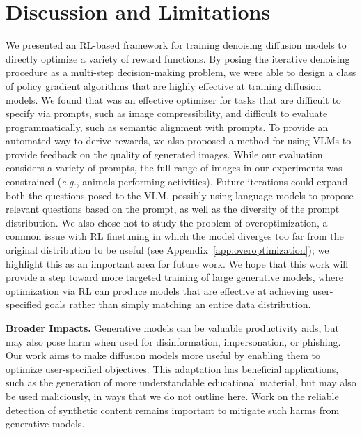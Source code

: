 \vspace{-8pt}
\section{Discussion and Limitations}
\vspace{-3pt}
\label{sec:discussion}

We presented an RL-based framework for training denoising diffusion models to directly optimize a variety of reward functions.
By posing the iterative denoising procedure as a multi-step decision-making problem, we were able to design a class of policy gradient algorithms that are highly effective at training diffusion models.
We found that \methodours{} was an effective optimizer for tasks that are difficult to specify via prompts, such as image compressibility, and difficult to evaluate programmatically, such as semantic alignment with prompts.
To provide an automated way to derive rewards, we also proposed a method for using VLMs to provide feedback on the quality of generated images.
While our evaluation considers a variety of prompts, the full range of images in our experiments was constrained (\emph{e.g.}, animals performing activities). Future iterations could expand both the questions posed to the VLM, possibly using language models to propose relevant questions based on the prompt, as well as the diversity of the prompt distribution.
We also chose not to study the problem of overoptimization, a common issue with RL finetuning in which the model diverges too far from the original distribution to be useful (see Appendix~\ref{app:overoptimization}); we highlight this as an important area for future work.
We hope that this work will provide a step toward more targeted training of large generative models, where optimization via RL can produce models that are effective at achieving user-specified goals rather than simply matching an entire data distribution.



\textbf{Broader Impacts.}
Generative models can be valuable productivity aids, but may also pose harm when used for disinformation, impersonation, or phishing.
Our work aims to make diffusion models more useful by enabling them to optimize user-specified objectives.
This adaptation has beneficial applications, such as the generation of more understandable educational material, but may also be used maliciously, in ways that we do not outline here.
Work on the reliable detection of synthetic content remains important to mitigate such harms from generative models.
